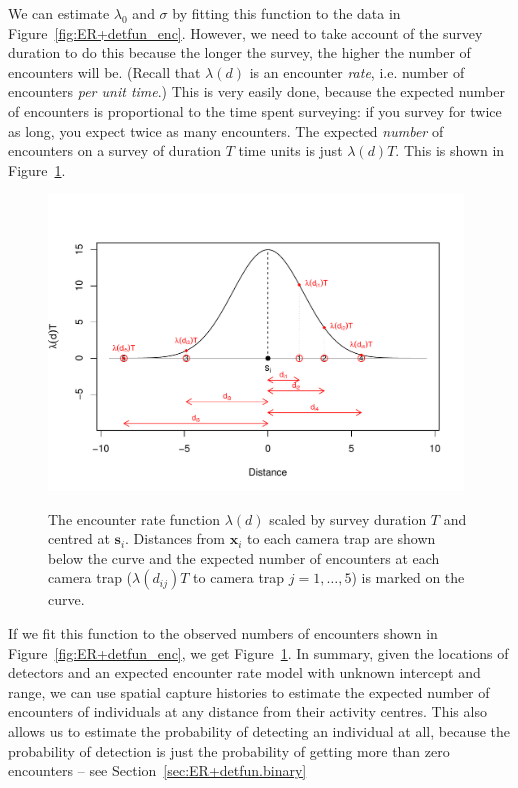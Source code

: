 We can estimate $\lambda_0$ and $\sigma$ by fitting this function to the data in Figure~\ref{fig:ER+detfun_enc}. However, we need to take account of the survey duration to do this because the longer the survey, the higher the number of encounters will be. (Recall that $\lambda(d)$ is an encounter \textit{rate}, i.e. number of encounters \textit{per unit time}.) This is very easily done, because the expected number of encounters is proportional to the time spent surveying: if you survey for twice as long, you expect twice as many encounters. The expected \textit{number} of encounters on a survey of duration $T$ time units is just $\lambda(d)T$. This is shown in Figure~\ref{fig:ER+detfun_ENwithdists}.

\begin{figure}[ht]
\caption{\small The encounter rate function $\lambda(d)$ scaled by survey duration $T$ and centred at $\bm{s}_i$. Distances from $\bm{x}_i$ to each camera trap are shown below the curve and the expected number of encounters at each camera trap ($\lambda(d_{ij})T$ to camera trap $j=1,\ldots,5$) is marked on the curve.}
\centering
\vspace{-24pt}
\includegraphics[width=11cm]{keepfigure/ENwithdists.pdf}
\label{fig:ER+detfun_ENwithdists}
\end{figure}

If we fit this function to the observed numbers of encounters shown in Figure~\ref{fig:ER+detfun_enc}, we get Figure~\ref{fig:ER+detfun_ENwithdists}. In summary, given the locations of detectors and an expected encounter rate model with unknown intercept and range, we can use spatial capture histories to estimate the expected number of encounters of individuals at any distance from their activity centres. This also allows us to estimate the probability of detecting an individual at all, because the probability of detection is just the probability of getting more than zero encounters -- see Section~\ref{sec:ER+detfun.binary}


